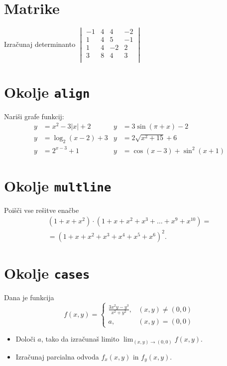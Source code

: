 \documentclass[a4paper,12pt]{article}
\begin{document}
\section*{Matrike}
Izračunaj determinanto
$\begin{vmatrix}
   
    -1 & 4 & 4 & -2 \\
    1 & 4 & 5 & -1 \\
    1 & 4 & -2 & 2 \\
    3 & 8 & 4 & 3 \\
\end{vmatrix}$

\section*{Okolje \texttt{align}}
Nariši grafe funkcij:
\begin{align*}
   y &= x^2 - 3|x| + 2   &  y &= 3 \sin(\pi+x) - 2 \\
   y &= \log_2(x-2) + 3  &  y &= 2 \sqrt{x^2+15} + 6 \\
   y &= 2^{x-3} + 1      &  y &= \cos(x-3) + \sin^2(x+1)
\end{align*}
   
\section*{Okolje \texttt{multline}}
Poišči vse rešitve enačbe
\begin{multline*}
(1+x+x^2) \cdot (1+x+x^2+x^3+\ldots+x^9+x^{10}) =\\
=(1+x+x^2+x^3+x^4+x^5+x^6)^2.
\end{multline*}

\section*{Okolje \texttt{cases}}
Dana je funkcija
\[
f(x,y) = \begin{cases}
    \frac{3x^2y-y^3}{x^2+y^2}, & (x,y) \neq (0,0) \\
    a, & (x,y) = (0,0)
\end{cases} \]
\begin{itemize}
\item Določi \(a\), tako da izračunaš limito \( \lim_{(x,y)\to(0,0)} f(x,y) \).
\item Izračunaj parcialna odvoda \(f_x(x,y)\) in \(f_y(x,y)\).
\end{itemize}
\end{document}
